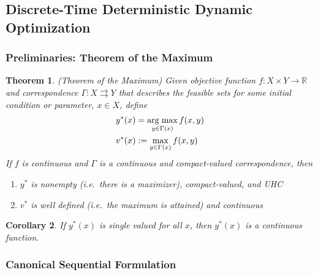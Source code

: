 \documentclass[12pt]{article}
\numberwithin{equation}{section} %
\theoremstyle{plain}
\newtheorem{thm}{Theorem}[section]
\newtheorem{cor}[thm]{Corollary}
\theoremstyle{definition}
\theoremstyle{remark}
\newcommand{\R}{\mathbb{R}}
\DeclareMathOperator*{\argmax}{arg\;max}
\begin{document}
\subsection{Discrete-Time Deterministic Dynamic Optimization}
\label{sec:discrete-dynamic}

\subsubsection{Preliminaries: Theorem of the Maximum}

\begin{thm}{\emph{(Theorem of the Maximum)}}
Given objective function $f:X\times Y\rightarrow\R$ and correspondence
$\Gamma:X\rightrightarrows Y$ that describes the feasible sets for some
initial condition or parameter, $x\in X$, define
\begin{align}
  y^*(x) &= \argmax_{y\in \Gamma(x)} f(x,y) \notag\\
  v^*(x) &:= \max_{y\in \Gamma(x)} f(x,y)
  \label{prob:thm-max}
\end{align}
If $f$ is continuous and $\Gamma$ is a continuous and compact-valued
correspondence, then
\begin{enumerate}
  \item $y^*$ is nonempty (i.e.\ there is a maximizer), compact-valued,
    and UHC
  \item $v^*$ is well defined (i.e.\ the maximum is attained) and
    continuous
\end{enumerate}
\end{thm}

\begin{cor}
If $y^*(x)$ is single valued for all $x$, then $y^*(x)$ is a continuous
function.
\end{cor}


\clearpage
\subsubsection{Canonical Sequential Formulation}
\end{document}
